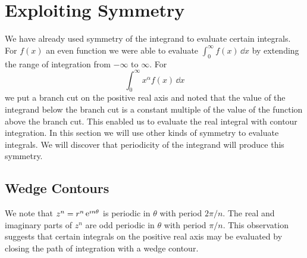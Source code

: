 














\section{Exploiting Symmetry}



We have already used symmetry of the integrand to evaluate certain integrals.
For $f(x)$ an even function we were able to evaluate $\int_0^\infty f(x)\,\dd x$
by extending the range of integration from $-\infty$ to $\infty$.  
For 
\[
\int_0^\infty x^\alpha f(x) \,\dd x
\]
we put a branch cut on the positive real axis and noted that the value of
the integrand below the branch cut is a constant multiple of the value
of the function above the branch cut.  This enabled us to evaluate the 
real integral with contour integration.  In this section we will 
use other kinds of symmetry to evaluate integrals.  We will discover
that periodicity of the integrand will produce this symmetry.




\subsection{Wedge Contours}



We note that $z^n = r^n \mathop{\mathrm{e}}\nolimits^{\imath n \theta}$ is periodic in $\theta$ with
period $2 \pi / n$.  The real and imaginary parts of $z^n$ are 
odd periodic in $\theta$ with period $\pi / n$.  This observation 
suggests that certain integrals on the positive real axis may be evaluated
by closing the path of integration with a wedge contour.






